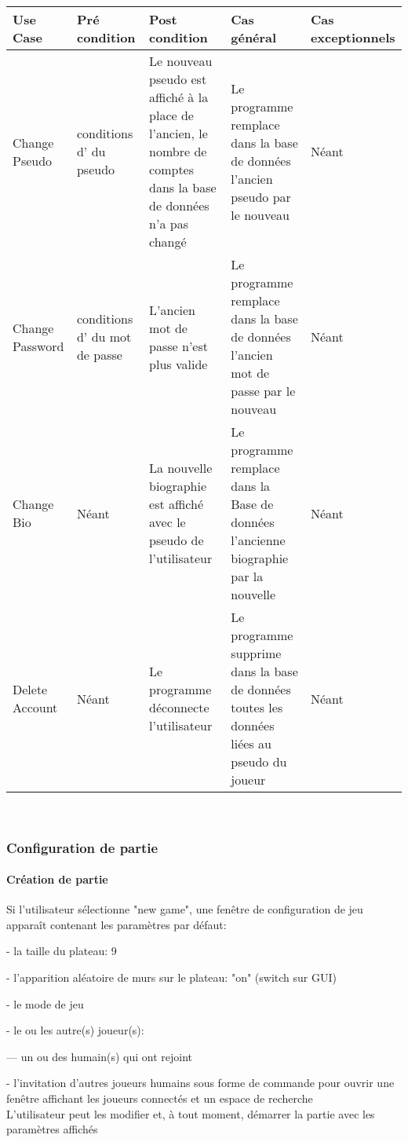 \documentclass[french, utf8]{article}
\begin{document}
\begin{center}
\begin{tabular}{|m{3cm}|m{3cm}|m{3cm}|m{3cm}|m{3cm}|}
\hline  Use Case & Pré condition      &  Post condition  & Cas général & Cas exceptionnels\\

\hline Change Pseudo  & conditions d'\nameref{sec:Enregistrement} du pseudo & Le nouveau pseudo est affiché à la place de l'ancien, le nombre de comptes dans la base de données n'a pas changé & Le programme remplace dans la base de données l'ancien pseudo par le nouveau & Néant \\
\hline Change Password  & conditions d'\nameref{sec:Enregistrement} du mot de passe & L'ancien mot de passe n'est plus valide & Le programme remplace dans la base de données l'ancien mot de passe par le nouveau & Néant \\
\hline Change Bio  & Néant & La nouvelle biographie est affiché avec le pseudo de l'utilisateur  & Le programme remplace dans la Base de données l'ancienne biographie par la nouvelle & Néant \\
\hline Delete Account  & Néant &  Le programme déconnecte l'utilisateur  & Le programme supprime dans la base de données toutes les données liées au pseudo du joueur & Néant \\
\hline
\end{tabular}\\
\end{center}


\subsubsection{Configuration de partie}
\paragraph{Création de partie}
\label{sec:CréationDePartie}
Si l’utilisateur sélectionne
"new game",
une fenêtre de configuration de jeu apparaît contenant les paramètres par défaut:
\item- la taille du plateau: 9
\item- l'apparition aléatoire de murs sur le plateau: "on" (switch sur GUI)
\item- le mode de jeu
\item- le ou les autre(s) joueur(s):
\item---  un ou des humain(s) qui ont rejoint
\item- l'invitation d'autres joueurs humains sous forme de commande pour ouvrir une fenêtre affichant les joueurs connectés et un espace de recherche
\\L'utilisateur peut les modifier et, à tout moment, démarrer la partie avec les paramètres
affichés
\end{document}
